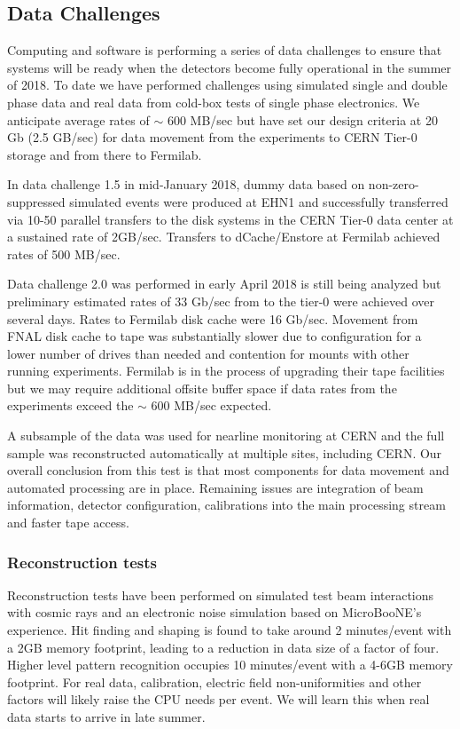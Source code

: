\subsection{Data Challenges}

Computing and software is performing a series of data challenges to ensure that systems will be ready when the detectors become fully operational in the summer of 2018.  To date we have performed challenges using simulated single and double phase data and real data from cold-box tests of single phase electronics.   We anticipate average rates of $\sim$ 600 MB/sec but have set our design criteria at 20 Gb (2.5 GB/sec) for data movement from the experiments to CERN Tier-0 storage and from there to Fermilab. 

In data challenge 1.5 in mid-January 2018, dummy data based on non-zero-suppressed simulated events were produced at EHN1 and successfully transferred via 10-50 parallel transfers to the  disk systems in the CERN Tier-0 data center at a sustained rate of 2GB/sec.    Transfers to dCache/Enstore at Fermilab achieved rates of 500 MB/sec.  

Data challenge 2.0 was performed in early April 2018 is still being analyzed but preliminary estimated  rates of 33 Gb/sec from  to the tier-0 were achieved over several days. Rates to Fermilab disk cache were 16 Gb/sec.  Movement from FNAL disk cache to tape was substantially slower due to configuration for a lower number of drives than needed and contention for mounts with other running experiments.   Fermilab is in the process of upgrading their tape facilities but we may require additional offsite buffer space if data rates from the experiments exceed the $\sim$ 600 MB/sec expected. 

A subsample of the data was used for nearline monitoring at CERN and the full sample was reconstructed automatically at multiple sites, including CERN. 
Our overall conclusion from this test is that most components for data movement and automated processing are in place.  Remaining issues are integration of beam information, detector configuration, calibrations into the main processing stream and faster tape access. 


\subsubsection{Reconstruction tests}
Reconstruction tests have been performed on simulated test beam interactions with cosmic rays and an electronic noise simulation based on MicroBooNE's experience.  Hit finding and shaping is found to take around 2 minutes/event with a 2GB memory footprint, leading to a reduction in data size of a factor of four.  Higher level pattern recognition occupies 10 minutes/event with a 4-6GB memory footprint. For real data, calibration, electric field non-uniformities and other factors will likely raise the CPU needs per event. We will learn this when real data starts to arrive in late summer. 


